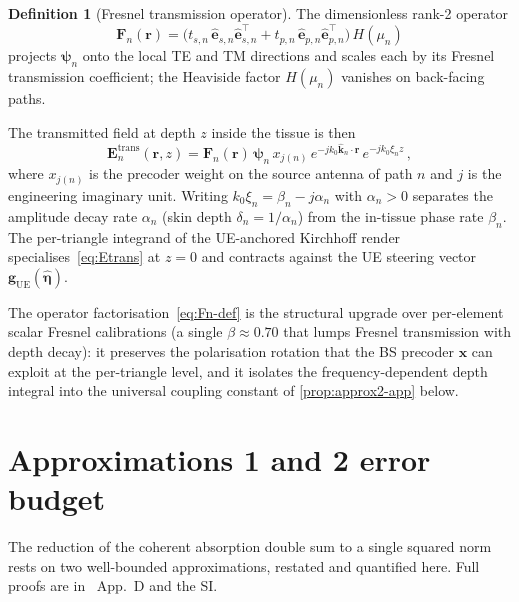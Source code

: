 \documentclass[journal,twocolumn,10pt]{IEEEtran}
\theoremstyle{plain}
\theoremstyle{definition}
\newtheorem{definition}[theorem]{Definition}
\theoremstyle{remark}
\newcommand{\EE}{\mathbf{E}}
\newcommand{\Fn}{\mathbf{F}_n}
\newcommand{\psin}{\bm{\psi}_n}
\begin{document}
\begin{definition}[Fresnel transmission operator]\label{def:fresnel-op}
The dimensionless rank-2 operator
\begin{equation}\label{eq:Fn-def}
  \Fn(\bm{r}) =
  \bigl(t_{s,n}\,\hat{\bm{e}}_{s,n}\hat{\bm{e}}_{s,n}^{\!\top}
       + t_{p,n}\,\hat{\bm{e}}_{p,n}\hat{\bm{e}}_{p,n}^{\!\top}\bigr)\,H(\mu_n)
\end{equation}
projects $\psin$ onto the local TE and TM directions and scales each
by its Fresnel transmission coefficient; the Heaviside factor
$H(\mu_n)$ vanishes on back-facing paths.
\end{definition}

The transmitted field at depth $z$ inside the tissue is then
\begin{equation}\label{eq:Etrans}
  \EE_n^{\mathrm{trans}}(\bm{r},z)
  = \Fn(\bm{r})\,\psin\,x_{j(n)}\,
    e^{-jk_0\hat{\bm{k}}_n\cdot\bm{r}}\,
    e^{-jk_0\xi_n z}\,,
\end{equation}
where $x_{j(n)}$ is the precoder weight on the source antenna of
path $n$ and $j$ is the engineering imaginary unit. Writing
$k_0\xi_n = \beta_n - j\alpha_n$ with $\alpha_n > 0$ separates the
amplitude decay rate $\alpha_n$ (skin depth $\delta_n = 1/\alpha_n$)
from the in-tissue phase rate $\beta_n$. The per-triangle integrand
of the UE-anchored Kirchhoff render specialises~\eqref{eq:Etrans}
at $z = 0$ and contracts against the UE steering vector
$\bm{g}_{\mathrm{UE}}(\hat{\bm{\eta}})$.

The operator factorisation~\eqref{eq:Fn-def} is the structural
upgrade over per-element scalar Fresnel calibrations (a single
$\beta\approx 0.70$ that lumps Fresnel transmission with depth
decay): it preserves the polarisation rotation that the BS
precoder $\bm{x}$ can exploit at the per-triangle level, and it
isolates the frequency-dependent depth integral into the universal
coupling constant of \cref{prop:approx2-app} below.

\section{Approximations 1 and 2 error budget}\label{app:approxs}

The reduction of the coherent absorption double sum to a single
squared norm rests on two well-bounded approximations,
restated and quantified here. Full proofs are
in~\cite{WydaegheMonograph} App.~D and the SI.
\end{document}

